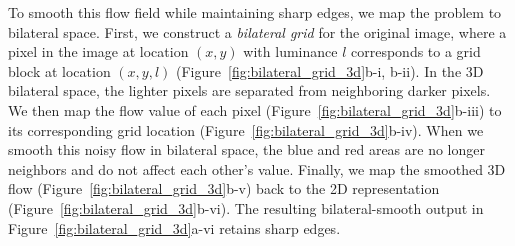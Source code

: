 To smooth this flow field while maintaining sharp edges, we map the problem to bilateral space.
First, we construct a \emph{bilateral grid} for the original image, where a pixel in the image at location $(x,y)$ with luminance $l$ corresponds to a grid block at location $(x,y,l)$ (Figure~\ref{fig:bilateral_grid_3d}b-i, b-ii).
In the 3D bilateral space, the lighter pixels are separated from neighboring darker pixels.
We then map the flow value of each pixel (Figure~\ref{fig:bilateral_grid_3d}b-iii) to its corresponding grid location (Figure~\ref{fig:bilateral_grid_3d}b-iv).
When we smooth this noisy flow in bilateral space, the blue and red areas are no longer neighbors and do not affect each other's value.
Finally, we map the smoothed 3D flow (Figure~\ref{fig:bilateral_grid_3d}b-v) back to the 2D representation (Figure~\ref{fig:bilateral_grid_3d}b-vi).
The resulting  bilateral-smooth output in Figure~\ref{fig:bilateral_grid_3d}a-vi retains sharp edges.
